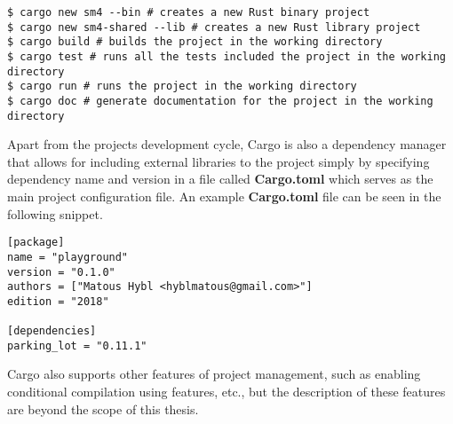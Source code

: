 \begin{lstlisting}
$ cargo new sm4 --bin # creates a new Rust binary project
$ cargo new sm4-shared --lib # creates a new Rust library project
$ cargo build # builds the project in the working directory
$ cargo test # runs all the tests included the project in the working directory
$ cargo run # runs the project in the working directory
$ cargo doc # generate documentation for the project in the working directory
\end{lstlisting}

Apart from the projects development cycle, Cargo is also a dependency manager that allows for including external libraries to the project simply by specifying dependency name and version in a file called \textbf{Cargo.toml} which serves as the main project configuration file.
An example \textbf{Cargo.toml} file can be seen in the following snippet.

\begin{lstlisting}
[package]
name = "playground"
version = "0.1.0"
authors = ["Matous Hybl <hyblmatous@gmail.com>"]
edition = "2018"

[dependencies]
parking_lot = "0.11.1"
\end{lstlisting}

Cargo also supports other features of project management, such as enabling conditional compilation using features, etc., but the description of these features are beyond the scope of this thesis.